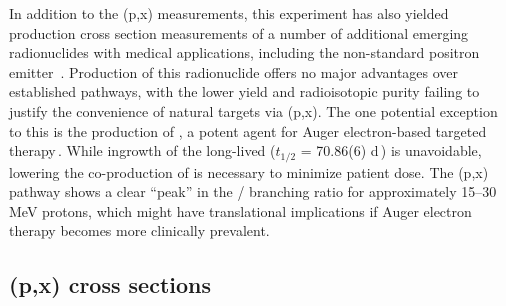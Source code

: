 In addition to the (p,x) measurements, this experiment has also yielded production cross section  measurements of  a number of additional  emerging radionuclides with medical applications,
including the non-standard positron emitter 
\,\cite{Thisgaard2011,Zaman1996,Hermanne2000a}.
Production of this radionuclide offers no major advantages over established pathways, with the  lower yield and radioisotopic purity failing to justify the convenience of natural targets  via   (p,x).
The one potential exception to this is the production of , a potent agent for Auger electron-based targeted therapy\,\cite{Thisgaard2011a,Valdovinos2017b,Thisgaard2014a}.
While ingrowth of the long-lived  ($t_{1/2}$ = 70.86(6) d\,\cite{Nesaraja2010}) is unavoidable, lowering the  co-production of  is necessary to minimize patient dose.
The (p,x) pathway shows a clear \enquote{peak} in the / branching ratio for approximately 15--30\,MeV protons, which might have translational implications if Auger electron therapy becomes more clinically prevalent. 




\subsection{(p,x) cross sections}


